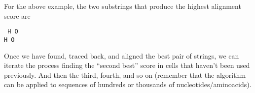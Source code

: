 \documentclass[../main.tex]{subfiles}
\begin{document}
For the above example, the two substrings that produce the highest alignment score are
\begin{center}
	\tt
	H O\\
	H O
\end{center}

Once we have found, traced back, and aligned the best pair of strings, we can iterate the process finding the ``second best'' score in cells that haven't been used previously. And then the third, fourth, and so on (remember that the algorithm can be applied to sequences of hundreds or thousands of nucleotides/aminoacids).
\end{document}
